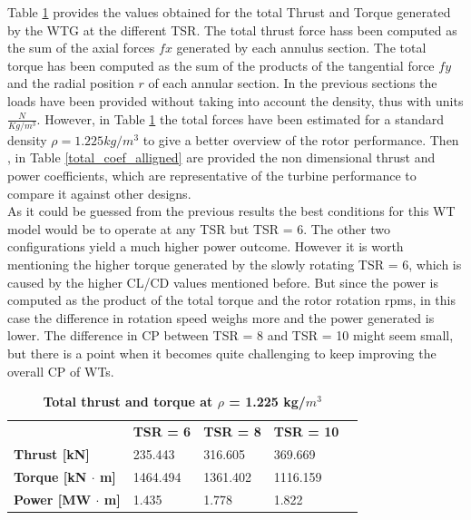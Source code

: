 Table \ref{total_forces_alligned} provides the values obtained for the total Thrust and Torque generated by the WTG at the different TSR. The total thrust force hass been computed as the sum of the axial forces $fx$ generated by each annulus section. The total torque has been computed as the sum of the products of the tangential force $fy$ and the radial position $r$ of each annular section. In the previous sections the loads have been provided without taking into account the density, thus with units $ \frac{N}{Kg/m^3} $. However, in Table \ref{total_forces_alligned} the total forces have been estimated for a standard density $\rho = 1.225 kg/m^3$ to give a better overview of the rotor performance. Then , in Table \ref{total_coef_alligned} are provided the non dimensional thrust and power coefficients, which are representative of the turbine performance to compare it against other designs. \\

As it could be guessed from the previous results the best conditions for this WT model would be to operate at any TSR but TSR = 6. The other two configurations yield a much higher power outcome. However it is worth mentioning the higher torque generated by the slowly rotating TSR = 6, which is caused by the higher CL/CD values mentioned before. But since the power is computed as the product of the total torque and the rotor rotation rpms, in this case the difference in rotation speed weighs more and the power generated is lower. The difference in CP between TSR = 8 and TSR = 10 might seem small, but there is a point when it becomes quite challenging to keep improving the overall CP of WTs.

\begin{table}[htpb]
\caption{\textbf{Total thrust and torque at $\rho$ = 1.225 kg/$m^3$}}
\begin{tabular}{lllll}
\cline{1-4}
\multicolumn{1}{|l|}{}                            & \multicolumn{1}{l|}{\textbf{TSR = 6}} & \multicolumn{1}{l|}{\textbf{TSR = 8}} & \multicolumn{1}{l|}{\textbf{TSR = 10}} &  \\ \cline{1-4}
\multicolumn{1}{|l|}{\textbf{Thrust {[}kN{]}}}   & \multicolumn{1}{l|}{235.443}          & \multicolumn{1}{l|}{316.605}          & \multicolumn{1}{l|}{369.669}           &  \\ \cline{1-4}
\multicolumn{1}{|l|}{\textbf{Torque {[}kN $\cdot$ m{]}}} & \multicolumn{1}{l|}{1464.494}         & \multicolumn{1}{l|}{1361.402}         & \multicolumn{1}{l|}{1116.159}          &  \\ \cline{1-4}
\multicolumn{1}{|l|}{\textbf{Power {[}MW $\cdot$ m{]}}} & \multicolumn{1}{l|}{1.435}         & \multicolumn{1}{l|}{1.778}         & \multicolumn{1}{l|}{1.822}          &  \\ \cline{1-4}
\end{tabular}
\label{total_forces_alligned}
\end{table}

